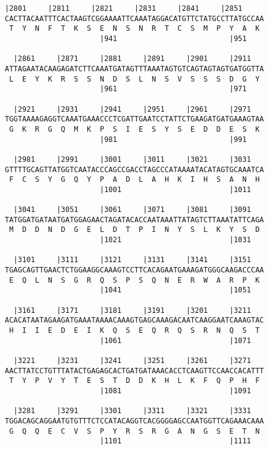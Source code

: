 \documentclass{article}
\begin{document}
\newpage
\begin{Verbatim}[fontfamily=courier]
  |2801     |2811     |2821     |2831     |2841     |2851   
CACTTACAATTTCACTAAGTCGGAAAATTCAAATAGGACATGTTCTATGCCTTATGCCAA
 T  Y  N  F  T  K  S  E  N  S  N  R  T  C  S  M  P  Y  A  K 
                      |941                          |951    

  |2861     |2871     |2881     |2891     |2901     |2911   
ATTAGAATACAAGAGATCTTCAAATGATAGTTTAAATAGTGTCAGTAGTAGTGATGGTTA
 L  E  Y  K  R  S  S  N  D  S  L  N  S  V  S  S  S  D  G  Y 
                      |961                          |971    

  |2921     |2931     |2941     |2951     |2961     |2971   
TGGTAAAAGAGGTCAAATGAAACCCTCGATTGAATCCTATTCTGAAGATGATGAAAGTAA
 G  K  R  G  Q  M  K  P  S  I  E  S  Y  S  E  D  D  E  S  K 
                      |981                          |991    

  |2981     |2991     |3001     |3011     |3021     |3031   
GTTTTGCAGTTATGGTCAATACCCAGCCGACCTAGCCCATAAAATACATAGTGCAAATCA
 F  C  S  Y  G  Q  Y  P  A  D  L  A  H  K  I  H  S  A  N  H 
                      |1001                         |1011   

  |3041     |3051     |3061     |3071     |3081     |3091   
TATGGATGATAATGATGGAGAACTAGATACACCAATAAATTATAGTCTTAAATATTCAGA
 M  D  D  N  D  G  E  L  D  T  P  I  N  Y  S  L  K  Y  S  D 
                      |1021                         |1031   

  |3101     |3111     |3121     |3131     |3141     |3151   
TGAGCAGTTGAACTCTGGAAGGCAAAGTCCTTCACAGAATGAAAGATGGGCAAGACCCAA
 E  Q  L  N  S  G  R  Q  S  P  S  Q  N  E  R  W  A  R  P  K 
                      |1041                         |1051   

  |3161     |3171     |3181     |3191     |3201     |3211   
ACACATAATAGAAGATGAAATAAAACAAAGTGAGCAAAGACAATCAAGGAATCAAAGTAC
 H  I  I  E  D  E  I  K  Q  S  E  Q  R  Q  S  R  N  Q  S  T 
                      |1061                         |1071   

  |3221     |3231     |3241     |3251     |3261     |3271   
AACTTATCCTGTTTATACTGAGAGCACTGATGATAAACACCTCAAGTTCCAACCACATTT
 T  Y  P  V  Y  T  E  S  T  D  D  K  H  L  K  F  Q  P  H  F 
                      |1081                         |1091   

  |3281     |3291     |3301     |3311     |3321     |3331   
TGGACAGCAGGAATGTGTTTCTCCATACAGGTCACGGGGAGCCAATGGTTCAGAAACAAA
 G  Q  Q  E  C  V  S  P  Y  R  S  R  G  A  N  G  S  E  T  N 
                      |1101                         |1111   

\end{Verbatim}
\end{document}
